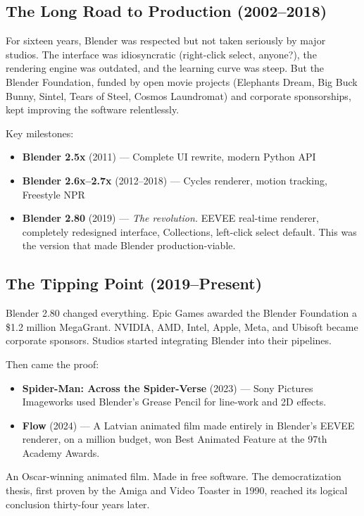\documentclass[11pt,letterpaper,twoside,openright]{book}
\begin{document}
\subsection{The Long Road to Production (2002--2018)}

For sixteen years, Blender was respected but not taken seriously by major studios. The interface was idiosyncratic (right-click select, anyone?), the rendering engine was outdated, and the learning curve was steep. But the Blender Foundation, funded by open movie projects (Elephants Dream, Big Buck Bunny, Sintel, Tears of Steel, Cosmos Laundromat) and corporate sponsorships, kept improving the software relentlessly.

Key milestones:
\begin{itemize}[leftmargin=2em]
  \item \textbf{Blender 2.5x} (2011) --- Complete UI rewrite, modern Python API
  \item \textbf{Blender 2.6x--2.7x} (2012--2018) --- Cycles renderer, motion tracking, Freestyle NPR
  \item \textbf{Blender 2.80} (2019) --- \textit{The revolution.} EEVEE real-time renderer, completely redesigned interface, Collections, left-click select default. This was the version that made Blender production-viable.
\end{itemize}

\subsection{The Tipping Point (2019--Present)}

Blender 2.80 changed everything. Epic Games awarded the Blender Foundation a \$1.2 million MegaGrant. NVIDIA, AMD, Intel, Apple, Meta, and Ubisoft became corporate sponsors. Studios started integrating Blender into their pipelines.

Then came the proof:
\begin{itemize}[leftmargin=2em]
  \item \textbf{Spider-Man: Across the Spider-Verse} (2023) --- Sony Pictures Imageworks used Blender's Grease Pencil for line-work and 2D effects.
  \item \textbf{Flow} (2024) --- A Latvian animated film made entirely in Blender's EEVEE renderer, on a  million budget, won Best Animated Feature at the 97th Academy Awards.
\end{itemize}

An Oscar-winning animated film. Made in free software. The democratization thesis, first proven by the Amiga and Video Toaster in 1990, reached its logical conclusion thirty-four years later.
\end{document}
